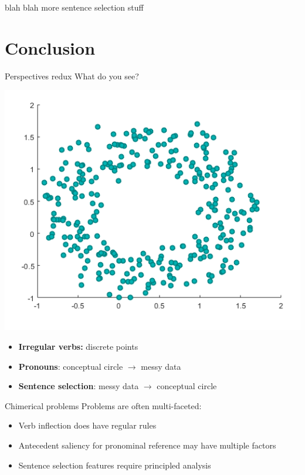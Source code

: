 \documentclass[10pt, compress]{beamer}
\begin{document}
\begin{frame}{}
	blah blah more sentence selection stuff
\end{frame}



\section{Conclusion}
\begin{frame}{Perspectives redux}
	What do you see?
	\begin{center}
		\includegraphics[width=.6\textwidth]{images/circleplot.png}
	\end{center}

	\pause
	\begin{itemize}
		\item \textbf{Irregular verbs:} discrete points	\pause
		\item \textbf{Pronouns}: conceptual circle $\rightarrow$ messy data	\pause
		\item \textbf{Sentence selection}: messy data $\rightarrow$ conceptual circle
	\end{itemize}
\end{frame}

\begin{frame}{Chimerical problems}
	Problems are often multi-faceted:

	\begin{itemize}
		\item Verb inflection does have regular rules
		\item Antecedent saliency for pronominal reference may have multiple factors
		\item Sentence selection features require principled analysis
	\end{itemize}
\end{frame}
\end{document}
